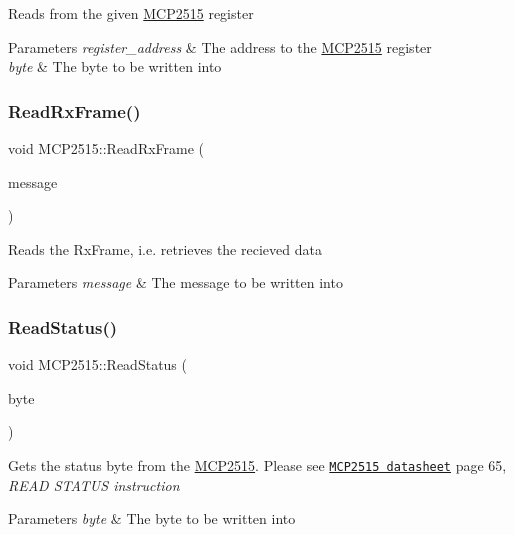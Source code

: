 Reads from the given \hyperlink{class_m_c_p2515}{M\+C\+P2515} register 
\begin{DoxyParams}{Parameters}
{\em register\+\_\+address} & The address to the \hyperlink{class_m_c_p2515}{M\+C\+P2515} register \\
\hline
{\em byte} & The byte to be written into \\
\hline
\end{DoxyParams}
\hypertarget{class_m_c_p2515_ae9c114f9fd7248d78fe5617648f7571b}{}\label{class_m_c_p2515_ae9c114f9fd7248d78fe5617648f7571b} 
\subsubsection{\texorpdfstring{Read\+Rx\+Frame()}{ReadRxFrame()}}
{\footnotesize\ttfamily void M\+C\+P2515\+::\+Read\+Rx\+Frame (\begin{DoxyParamCaption}\item[{\hyperlink{struct_can_message}{Can\+Message} \&}]{message }\end{DoxyParamCaption})\hspace{0.3cm}{\ttfamily [private]}}

Reads the Rx\+Frame, i.\+e. retrieves the recieved data 
\begin{DoxyParams}{Parameters}
{\em message} & The message to be written into \\
\hline
\end{DoxyParams}
\hypertarget{class_m_c_p2515_ae466f10eea5ccf0f36439757d4baf6b5}{}\label{class_m_c_p2515_ae466f10eea5ccf0f36439757d4baf6b5} 
\subsubsection{\texorpdfstring{Read\+Status()}{ReadStatus()}}
{\footnotesize\ttfamily void M\+C\+P2515\+::\+Read\+Status (\begin{DoxyParamCaption}\item[{uint8\+\_\+t \&}]{byte }\end{DoxyParamCaption})\hspace{0.3cm}{\ttfamily [private]}}

Gets the status byte from the \hyperlink{class_m_c_p2515}{M\+C\+P2515}. Please see \href{http://ww1.microchip.com/downloads/en/DeviceDoc/21801G.pdf}{\tt M\+C\+P2515 datasheet} page 65, {\itshape R\+E\+AD S\+T\+A\+T\+US instruction} 
\begin{DoxyParams}{Parameters}
{\em byte} & The byte to be written into \\
\hline
\end{DoxyParams}
\hypertarget{class_m_c_p2515_a5a218199ca1dfcb25cb95890bc0220fc}{}\label{class_m_c_p2515_a5a218199ca1dfcb25cb95890bc0220fc} 

